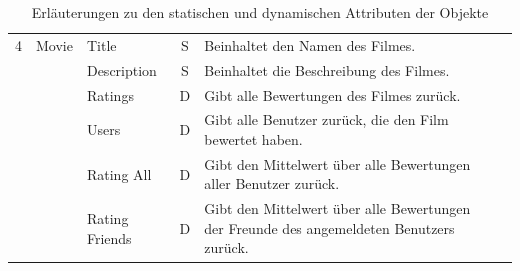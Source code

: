 \begin{table}[ht]
\begin{center}
\begin{tabular}{lllcp{9cm}l}
        \midrule
            4 & Movie & Title & S & Beinhaltet den Namen des Filmes. \\
            & & Description & S & Beinhaltet die Beschreibung des Filmes. \\
            & & Ratings & D & Gibt alle Bewertungen des Filmes zurück. \\
            & & Users & D & Gibt alle Benutzer zurück, die den Film bewertet haben. \\
            & & Rating All & D & Gibt den Mittelwert über alle Bewertungen aller Benutzer zurück. \\
            & & Rating Friends & D & Gibt den Mittelwert über alle Bewertungen der Freunde des 
                                 angemeldeten Benutzers zurück. \\
        \bottomrule
    \end{tabular}
    \caption{Erläuterungen zu den statischen und dynamischen Attributen der Objekte}
    \label{tab:attribute}
\end{center}
\end{table}
